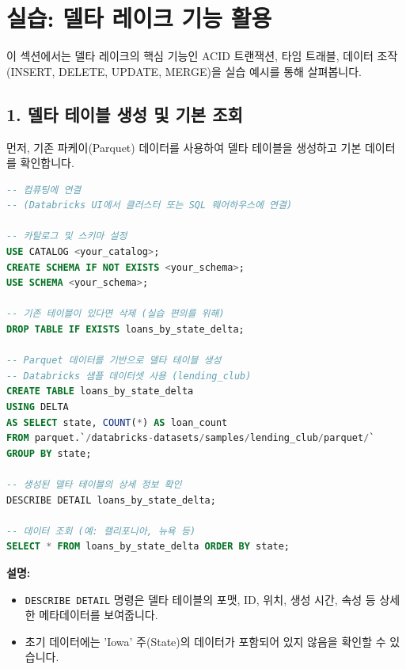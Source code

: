 \documentclass[11pt,a4paper]{article}
\begin{document}
\newpage
\section*{실습: 델타 레이크 기능 활용}

이 섹션에서는 델타 레이크의 핵심 기능인 ACID 트랜잭션, 타임 트래블, 데이터 조작(INSERT, DELETE, UPDATE, MERGE)을 실습 예시를 통해 살펴봅니다.

\subsection*{1. 델타 테이블 생성 및 기본 조회}

먼저, 기존 파케이(Parquet) 데이터를 사용하여 델타 테이블을 생성하고 기본 데이터를 확인합니다.

\begin{lstlisting}[language=SQL, caption={델타 테이블 생성 및 데이터 조회}, label={lst:delta_create_select}]
-- 컴퓨팅에 연결
-- (Databricks UI에서 클러스터 또는 SQL 웨어하우스에 연결)

-- 카탈로그 및 스키마 설정
USE CATALOG <your_catalog>;
CREATE SCHEMA IF NOT EXISTS <your_schema>;
USE SCHEMA <your_schema>;

-- 기존 테이블이 있다면 삭제 (실습 편의를 위해)
DROP TABLE IF EXISTS loans_by_state_delta;

-- Parquet 데이터를 기반으로 델타 테이블 생성
-- Databricks 샘플 데이터셋 사용 (lending_club)
CREATE TABLE loans_by_state_delta
USING DELTA
AS SELECT state, COUNT(*) AS loan_count
FROM parquet.`/databricks-datasets/samples/lending_club/parquet/`
GROUP BY state;

-- 생성된 델타 테이블의 상세 정보 확인
DESCRIBE DETAIL loans_by_state_delta;

-- 데이터 조회 (예: 캘리포니아, 뉴욕 등)
SELECT * FROM loans_by_state_delta ORDER BY state;
\end{lstlisting}
\begin{tcolorbox}[colback=gray!5!white, colframe=gray!75!black, sharp corners, boxrule=0.8pt]
\textbf{설명:}
\begin{itemize}
    \item \texttt{DESCRIBE DETAIL} 명령은 델타 테이블의 포맷, ID, 위치, 생성 시간, 속성 등 상세한 메타데이터를 보여줍니다.
    \item 초기 데이터에는 'Iowa' 주(State)의 데이터가 포함되어 있지 않음을 확인할 수 있습니다.
\end{itemize}
\end{tcolorbox}
\end{document}
